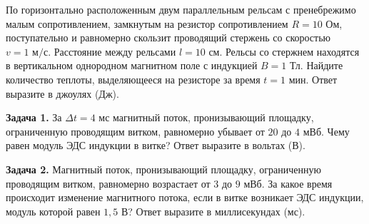 \begin{taskbasic}[code={\label{task:elem_ind_v9_n23}}]
По горизонтально расположенным двум параллельным рельсам с пренебрежимо малым сопротивлением, замкнутым на резистор сопротивлением $R = 10\text{ Ом}$, поступательно и равномерно скользит проводящий стержень со скоростью $v = 1\text{ м/с}$. Расстояние между рельсами $l = 10\text{ см}$. Рельсы со стержнем находятся в вертикальном однородном магнитном поле с индукцией $B = 1\text{ Тл}$. Найдите количество теплоты, выделяющееся на резисторе за время $t = 1\text{ мин}$. Ответ выразите в джоулях (Дж).

\end{taskbasic}


\begin{taskbasic}[code={\label{task:elem_ind_v11_n12}}]
\textbf{Задача 1.} За $\Delta t = 4\text{ мс}$ магнитный поток, пронизывающий площадку, ограниченную проводящим витком, равномерно убывает от $20$ до $4\text{ мВб}$. Чему равен модуль ЭДС индукции в витке? Ответ выразите в вольтах (В).

\end{taskbasic}

\begin{taskbasic}[code={\label{task:elem_ind_v12_n12}}]
\textbf{Задача 2.} Магнитный поток, пронизывающий площадку, ограниченную проводящим витком, равномерно возрастает от $3$ до $9\text{ мВб}$. За какое время происходит изменение магнитного потока, если в витке возникает ЭДС индукции, модуль которой равен $1{,}5\text{ В}$? Ответ выразите в миллисекундах (мс).

\end{taskbasic}

